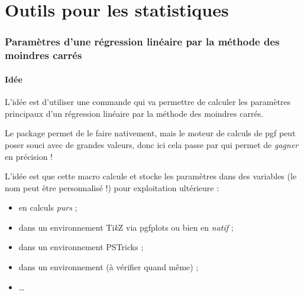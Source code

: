 \documentclass[a4paper,french,11pt]{article}
\providecommand\tikzlogo{Ti\textit{k}Z}
\providecommand\PSTricks{\textsf{PSTricks}\xspace}
\let\TikZ\tikzlogo
\newcommand\ctex[1]{\tcbox[vignettelatex]{#1}}
\begin{document}
\begin{codesortie}
\hfill~
\hspace{1.5cm}
\hspace{1.5cm}
\hfill~
\end{codesortie}

\newpage

\part{Outils pour les statistiques}

\section{Paramètres d'une régression linéaire par la méthode des moindres carrés}\label{reglin}

\subsection{Idée}

\begin{codeidee}
L'idée est d'utiliser une commande qui va permettre de calculer les paramètres principaux d'un régression linéaire par la méthode des moindres carrés.

Le package \ctex{pgfpots} permet de le faire nativement, mais le moteur de calculs de \textsf{pgf} peut poser souci avec de grandes valeurs, donc ici cela passe par \ctex{xfp} qui permet de \textit{gagner} en précision !

\smallskip

L'idée est que cette macro calcule et stocke les paramètres dans des variables (le nom peut être personnalisé !) pour exploitation ultérieure :

\begin{itemize}
	\item en calculs \textit{purs} ;
	\item dans un environnement \TikZ{} via \textsf{pgfplots} ou bien en \textit{natif} ;
	\item dans un environnement \PSTricks{} ;
	\item dans un environnement  (à vérifier quand même) ;
	\item \ldots
\end{itemize}
\end{codeidee}
\end{document}
